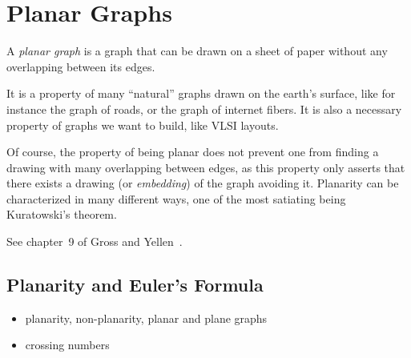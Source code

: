 
\chapter{Planar Graphs}
\label{chap:planar_graphs}

A {\it planar graph} is a graph that can be drawn on a sheet of paper without any overlapping between its edges.

It is a property of many ``natural'' graphs drawn on the earth's surface, like for instance the graph of roads, or the graph of internet fibers. It is also a necessary property of graphs we want to build, like VLSI layouts.

Of course, the property of being planar does not prevent one from finding a drawing with many overlapping between edges, as this property only asserts that there exists a drawing (or {\it embedding}) of the graph avoiding it. Planarity can be characterized in many different ways, one of the most satiating being Kuratowski's theorem.

See chapter~9 of Gross and Yellen~\cite{GrossYellen1999}.



\section{Planarity and Euler's Formula}

\begin{itemize}
\item planarity, non-planarity, planar and plane graphs

\item crossing numbers
\end{itemize}

